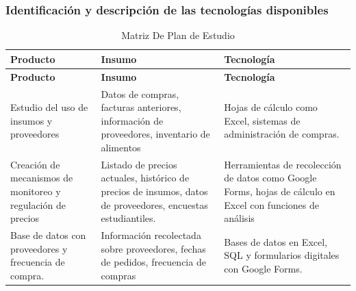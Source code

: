 \documentclass[letterpaper, 11pt]{report}
\begin{document}
\newpage
\subsubsection{Identificación y descripción de las tecnologías disponibles}

\begin{longtable}{|p{.3\linewidth}|p{.3\linewidth}|p{.3\linewidth}|}
      \caption{Matriz De Plan de Estudio}                                                                                                                                 \\
      \hline
      \textbf{Producto}                                                    & \textbf{Insumo}                                                        & \textbf{Tecnología} \\
      \hline
      \endfirsthead

      \hline
      \textbf{Producto}                                                    & \textbf{Insumo}                                                        & \textbf{Tecnología} \\
      \hline
      \endhead

      \hline
      \endfoot

      \hline
      \endlastfoot

      Estudio del uso de insumos y proveedores                             & Datos de compras, facturas
      anteriores, información de proveedores, inventario de alimentos      & Hojas de
      cálculo como Excel, sistemas de administración de compras.                                                                                                          \\\hline

      Creación de mecanismos de monitoreo y regulación de precios          & Listado de
      precios actuales, histórico de precios de insumos, datos de proveedores,
      encuestas estudiantiles.                                             & Herramientas de recolección de datos como Google
      Forms, hojas de cálculo en Excel con funciones de análisis                                                                                                          \\\hline

      Base de datos con proveedores y frecuencia de compra.                & Información recolectada
      sobre proveedores, fechas de pedidos, frecuencia de compras          & Bases de datos en
      Excel, SQL y formularios digitales con Google Forms.                                                                                                                \\\hline


\end{longtable}
\end{document}
